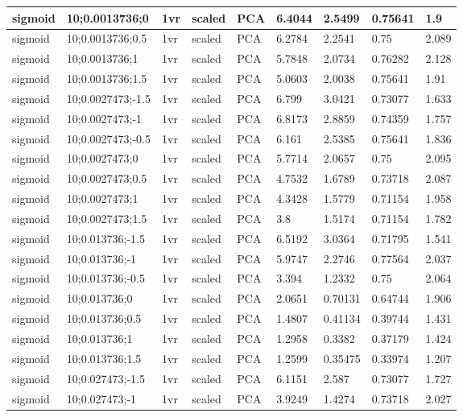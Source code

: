\begin{longtable}{lllllllll}
sigmoid & 10;0.0013736;0 & 1vr & scaled & PCA & 6.4044 & 2.5499 & 0.75641 & 1.9\\ \hline
sigmoid & 10;0.0013736;0.5 & 1vr & scaled & PCA & 6.2784 & 2.2541 & 0.75 & 2.089\\ \hline
sigmoid & 10;0.0013736;1 & 1vr & scaled & PCA & 5.7848 & 2.0734 & 0.76282 & 2.128\\ \hline
sigmoid & 10;0.0013736;1.5 & 1vr & scaled & PCA & 5.0603 & 2.0038 & 0.75641 & 1.91\\ \hline
sigmoid & 10;0.0027473;-1.5 & 1vr & scaled & PCA & 6.799 & 3.0421 & 0.73077 & 1.633\\ \hline
sigmoid & 10;0.0027473;-1 & 1vr & scaled & PCA & 6.8173 & 2.8859 & 0.74359 & 1.757\\ \hline
sigmoid & 10;0.0027473;-0.5 & 1vr & scaled & PCA & 6.161 & 2.5385 & 0.75641 & 1.836\\ \hline
sigmoid & 10;0.0027473;0 & 1vr & scaled & PCA & 5.7714 & 2.0657 & 0.75 & 2.095\\ \hline
sigmoid & 10;0.0027473;0.5 & 1vr & scaled & PCA & 4.7532 & 1.6789 & 0.73718 & 2.087\\ \hline
sigmoid & 10;0.0027473;1 & 1vr & scaled & PCA & 4.3428 & 1.5779 & 0.71154 & 1.958\\ \hline
sigmoid & 10;0.0027473;1.5 & 1vr & scaled & PCA & 3.8 & 1.5174 & 0.71154 & 1.782\\ \hline
sigmoid & 10;0.013736;-1.5 & 1vr & scaled & PCA & 6.5192 & 3.0364 & 0.71795 & 1.541\\ \hline
sigmoid & 10;0.013736;-1 & 1vr & scaled & PCA & 5.9747 & 2.2746 & 0.77564 & 2.037\\ \hline
sigmoid & 10;0.013736;-0.5 & 1vr & scaled & PCA & 3.394 & 1.2332 & 0.75 & 2.064\\ \hline
sigmoid & 10;0.013736;0 & 1vr & scaled & PCA & 2.0651 & 0.70131 & 0.64744 & 1.906\\ \hline
sigmoid & 10;0.013736;0.5 & 1vr & scaled & PCA & 1.4807 & 0.41134 & 0.39744 & 1.431\\ \hline
sigmoid & 10;0.013736;1 & 1vr & scaled & PCA & 1.2958 & 0.3382 & 0.37179 & 1.424\\ \hline
sigmoid & 10;0.013736;1.5 & 1vr & scaled & PCA & 1.2599 & 0.35475 & 0.33974 & 1.207\\ \hline
sigmoid & 10;0.027473;-1.5 & 1vr & scaled & PCA & 6.1151 & 2.587 & 0.73077 & 1.727\\ \hline
sigmoid & 10;0.027473;-1 & 1vr & scaled & PCA & 3.9249 & 1.4274 & 0.73718 & 2.027\\ \hline

\end{longtable}
